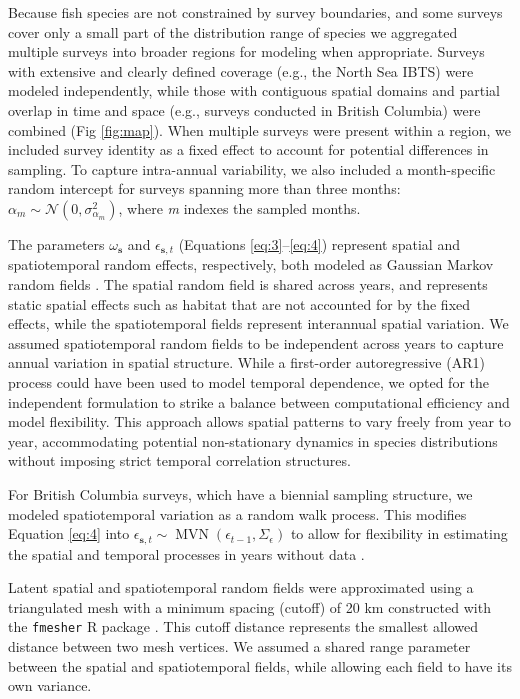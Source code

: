 \documentclass[lineno,pdflatex,sn-nature]{sn-jnl}%
\begin{document}
\begin{appendices}
Because fish species are not constrained by survey boundaries, and some surveys cover only a small part of the distribution range of species we aggregated multiple surveys into broader regions for modeling when appropriate. Surveys with extensive and clearly defined coverage (e.g., the North Sea IBTS) were modeled independently, while those with contiguous spatial domains and partial overlap in time and space (e.g., surveys conducted in British Columbia) were combined (Fig \ref{fig:map}). When multiple surveys were present within a region, we included survey identity as a fixed effect to account for potential differences in sampling. To capture intra-annual variability, we also included a month-specific random intercept for surveys spanning more than three months: $\alpha_m \sim \mathcal{N}(0, \sigma_{\alpha_m}^{2})$, where \textit{m} indexes the sampled months.

The parameters \( \omega_{\mathbf{s}} \) and \( \epsilon_{\mathbf{s},t} \) (Equations \ref{eq:3}--\ref{eq:4}) represent spatial and spatiotemporal random effects, respectively, both modeled as Gaussian Markov random fields \citep{lindgren_explicit_2011}. The spatial random field is shared across years, and represents static spatial effects such as habitat that are not accounted for by the fixed effects, while the spatiotemporal fields represent interannual spatial variation. We assumed spatiotemporal random fields to be independent across years to capture annual variation in spatial structure. While a first-order autoregressive (AR1) process could have been used to model temporal dependence, we opted for the independent formulation to strike a balance between computational efficiency and model flexibility. This approach allows spatial patterns to vary freely from year to year, accommodating potential non-stationary dynamics in species distributions without imposing strict temporal correlation structures.

For British Columbia surveys, which have a biennial sampling structure, we modeled spatiotemporal variation as a random walk process. This modifies Equation \ref{eq:4} into $\epsilon_{\boldsymbol{s},t} \sim  \operatorname{MVN}(\epsilon_{t-1},\Sigma_{\epsilon})$ to allow for flexibility in estimating the spatial and temporal processes in years without data \citep{ward_win_2024}.

Latent spatial and spatiotemporal random fields were approximated using a triangulated mesh with a minimum spacing (cutoff) of 20 km constructed with the \texttt{fmesher} R package \citep{lindgren_fmesher_2025}. This cutoff distance represents the smallest allowed distance between two mesh vertices. We assumed a shared range parameter between the spatial and spatiotemporal fields, while allowing each field to have its own variance.


\end{appendices}
\end{document}
